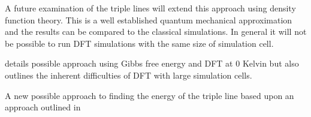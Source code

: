 \documentclass[12pt,a4paper]{book}
\begin{document}
A future examination of the triple lines will extend this approach using density function theory. This is a well established quantum mechanical approximation and the results can be compared to the classical simulations. In general it will not be possible to run DFT simulations with the same size of simulation cell.

\cite{HASHIBON2010939} details possible approach using Gibbs free energy and DFT at 0 Kelvin but also outlines the inherent difficulties of DFT with large simulation cells.

A new possible approach to finding the energy of the triple line based upon an approach outlined in \cite{Lee2004}

  

 
\end{document}
